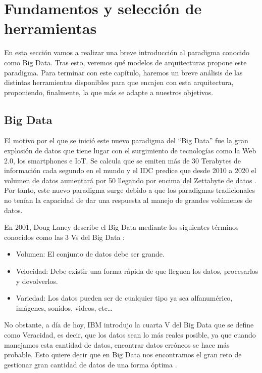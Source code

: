 \chapter{Fundamentos y selección de herramientas\label{FunAndTools}}

En esta sección vamos a realizar una breve introducción al paradigma
conocido como Big Data. Tras esto, veremos qué modelos de arquitecturas
propone este paradigma. Para terminar con este capítulo, haremos un breve
análisis de las distintas herramientas disponibles para que encajen con
esta arquitectura, proponiendo, finalmente, la que más se adapte a nuestros
objetivos.

\section{Big Data\label{WhatIsBigD}}

El motivo por el que se inició este nuevo paradigma del “Big Data” fue
la gran explosión de datos que tiene lugar con el surgimiento
de tecnologías como la Web 2.0, los smartphones e IoT. Se calcula que
se emiten más de 30 Terabytes de información cada segundo en el mundo
\cite{BD-2} y el IDC predice que desde 2010 a 2020 el volumen de datos
aumentará por 50 llegando por encima del Zettabyte de datos
\cite{BD-2}. Por tanto, este nuevo paradigma surge debido a que los
paradigmas tradicionales no tenían la capacidad de dar una respuesta
al manejo de grandes volúmenes de datos.

En 2001, Doug Laney describe el Big Data mediante los siguientes términos
conocidos como las 3 Vs del Big Data \cite{BD-4}:

\begin{itemize}
\item Volumen: El conjunto de datos debe ser grande.
\item Velocidad: Debe existir una forma rápida de que lleguen los datos,
  procesarlos y devolverlos.
\item Variedad: Los datos pueden ser de cualquier tipo ya sea alfanumérico,
  imágenes, sonidos, videos, etc…
\end{itemize}

No obstante, a día de hoy, IBM introdujo la cuarta V del Big Data que se
define como Veracidad, es decir, que los datos sean lo más reales posible,
ya que cuando manejamos esta cantidad de datos, encontrar datos erróneos se
hace más probable. Esto quiere decir que en Big Data nos encontramos el
gran reto de gestionar gran cantidad de datos de una forma óptima
\cite{BD-5}.

